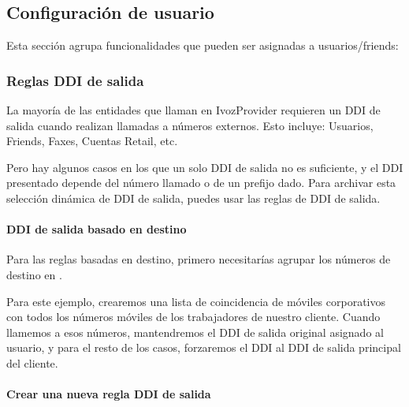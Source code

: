 \documentclass[letterpaper,10pt,spanish]{sphinxmanual}
\begin{document}
\subsection{Configuración de usuario}
\label{administration_portal/client/vpbx/user_configuration/index:user-configuration}\label{administration_portal/client/vpbx/user_configuration/index::doc}
Esta sección agrupa funcionalidades que pueden ser asignadas a usuarios/friends:


\subsubsection{Reglas DDI de salida}
\label{administration_portal/client/vpbx/user_configuration/outgoing_ddi_rules:outgoing-ddi-rules}\label{administration_portal/client/vpbx/user_configuration/outgoing_ddi_rules:outgoingddi-rules}\label{administration_portal/client/vpbx/user_configuration/outgoing_ddi_rules::doc}
La mayoría de las entidades que llaman en IvozProvider requieren un DDI de salida cuando realizan llamadas a números externos. Esto incluye: Usuarios, Friends, Faxes, Cuentas Retail, etc.

Pero hay algunos casos en los que un solo DDI de salida no es suficiente, y el DDI presentado depende del número llamado o de un prefijo dado. Para archivar esta selección dinámica de DDI de salida, puedes usar las reglas de DDI de salida.


\paragraph{DDI de salida basado en destino}
\label{administration_portal/client/vpbx/user_configuration/outgoing_ddi_rules:outgoing-ddi-based-on-destination}
Para las reglas basadas en destino, primero necesitarías agrupar los números de destino en {\hyperref[administration_portal/client/vpbx/routing_tools/match_lists:match\string-lists]{}}.

Para este ejemplo, crearemos una lista de coincidencia de móviles corporativos con todos los números móviles de los trabajadores de nuestro cliente. Cuando llamemos a esos números, mantendremos el DDI de salida original asignado al usuario, y para el resto de los casos, forzaremos el DDI al DDI de salida principal del cliente.
\paragraph{Crear una nueva regla DDI de salida}
\end{document}
